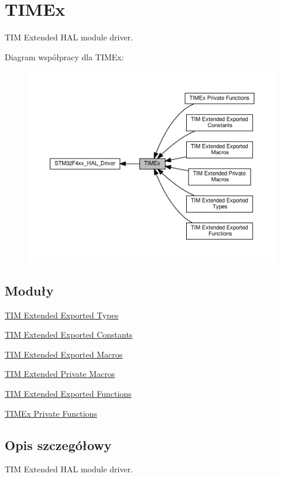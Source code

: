 \hypertarget{group___t_i_m_ex}{}\section{T\+I\+M\+Ex}
\label{group___t_i_m_ex}


T\+IM Extended H\+AL module driver.  


Diagram współpracy dla T\+I\+M\+Ex\+:\nopagebreak
\begin{figure}[H]
\begin{center}
\leavevmode
\includegraphics[width=350pt]{group___t_i_m_ex}
\end{center}
\end{figure}
\subsection*{Moduły}
\begin{DoxyCompactItemize}
\item 
\hyperlink{group___t_i_m_ex___exported___types}{T\+I\+M Extended Exported Types}
\item 
\hyperlink{group___t_i_m_ex___exported___constants}{T\+I\+M Extended Exported Constants}
\item 
\hyperlink{group___t_i_m_ex___exported___macros}{T\+I\+M Extended Exported Macros}
\item 
\hyperlink{group___t_i_m_ex___private___macros}{T\+I\+M Extended Private Macros}
\item 
\hyperlink{group___t_i_m_ex___exported___functions}{T\+I\+M Extended Exported Functions}
\item 
\hyperlink{group___t_i_m_ex___private___functions}{T\+I\+M\+Ex Private Functions}
\end{DoxyCompactItemize}


\subsection{Opis szczegółowy}
T\+IM Extended H\+AL module driver. 

